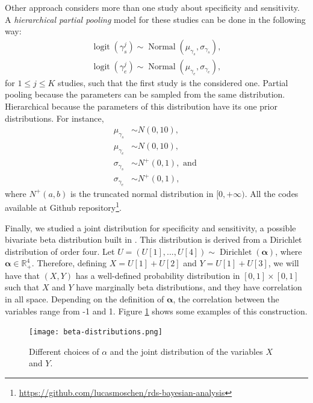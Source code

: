 Other approach considers more than one study about specificity and
sensitivity. A {\em hierarchical partial pooling} model for these studies
can be done in the following way: 
\begin{gather*}
    \operatorname{logit}(\gamma_s^j) \sim \operatorname{Normal}(\mu_{\gamma_s}, \sigma_{\gamma_s}), \\
    \operatorname{logit}(\gamma_e^j) \sim \operatorname{Normal}(\mu_{\gamma_e}, \sigma_{\gamma_e}), 
\end{gather*}
for $1 \le j \le K$ studies, such that the first study is the considered one.
Partial pooling because the parameters can be sampled from the same
distribution. Hierarchical because the parameters of this distribution have
its one prior distributions. For instance, 
\begin{align*}
    \mu_{\gamma_s} &\sim N(0, 10), \\ 
    \mu_{\gamma_e} &\sim N(0, 10), \\
    \sigma_{\gamma_s} &\sim N^+(0,1), \text{ and } \\
    \sigma_{\gamma_e} &\sim N^+(0,1),
\end{align*}
where $N^+(a,b)$ is the truncated normal distribution in $[0,+\infty)$. All
the codes available at Github
repository\footnote{\url{https://github.com/lucasmoschen/rds-bayesian-analysis}}.

Finally, we studied a joint distribution for specificity and sensitivity, a
possible bivariate beta distribution built in \cite{olkin2015constructions}.
This distribution is derived from a Dirichlet distribution of order four. Let $U = (U[1],...,U[4]) \sim \operatorname{Dirichlet}(\boldsymbol{\alpha})$, where
$\boldsymbol{\alpha} \in \mathbb{R}^4_+$. Therefore, defining $X = U[1] +
U[2]$ and $Y = U[1] + U[3]$, we will have that $(X,Y)$ has a well-defined
probability distribution in
$[0,1] \times [0,1]$ such that $X$ and $Y$ have marginally beta distributions,
and they have correlation in all space. Depending on the definition of
$\boldsymbol{\alpha}$, the correlation between the variables range from -1 and
1. Figure \ref{fig:beta-bivariate} shows some examples of this construction. 

\begin{figure}[!ht]
    \centering
    \texttt{[image: beta-distributions.png]}
    \caption{Different choices of $\alpha$ and the joint distribution of the variables $X$ and $Y$.}
    \label{fig:beta-bivariate}
\end{figure}

